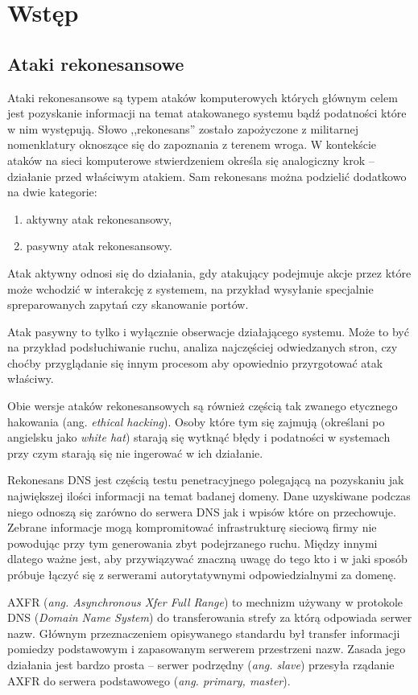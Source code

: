 \chapter{Wstęp}

\section{Ataki rekonesansowe}
Ataki rekonesansowe są typem ataków komputerowych których głównym celem jest pozyskanie informacji na temat atakowanego systemu bądź podatności które w nim występują. Słowo ,,rekonesans'' zostało zapożyczone z militarnej nomenklatury oknoszące się do zapoznania z terenem wroga. W kontekście ataków na sieci komputerowe stwierdzeniem określa się analogiczny krok -- działanie przed właściwym atakiem. Sam rekonesans można podzielić dodatkowo na dwie kategorie:
\begin{enumerate}
	\item aktywny atak rekonesansowy,
	\item pasywny atak rekonesansowy.
\end{enumerate}
Atak aktywny odnosi się do działania, gdy atakujący podejmuje akcje przez które może wchodzić w interakcję z systemem, na przykład wysyłanie specjalnie spreparowanych zapytań czy skanowanie portów.

Atak pasywny to tylko i wyłącznie obserwacje działającego systemu. Może to być na przykład podsłuchiwanie ruchu, analiza najczęściej odwiedzanych stron, czy choćby przyglądanie się innym procesom aby opowiednio przyrgotować atak właściwy.

Obie wersje ataków rekonesansowych są również częścią tak zwanego etycznego hakowania (ang. \textit{ethical hacking}). Osoby które tym się zajmują (określani po angielsku jako \textit{white hat}) starają się wytknąć błędy i podatności w systemach przy czym starają się nie ingerować w ich działanie.

Rekonesans DNS jest częścią testu penetracyjnego polegającą na pozyskaniu jak największej ilości informacji na temat badanej domeny. Dane uzyskiwane podczas niego odnoszą się zarówno do serwera DNS jak i wpisów które on przechowuje. Zebrane informacje mogą kompromitować infrastrukturę sieciową firmy nie powodując przy tym generowania zbyt podejrzanego ruchu. Między innymi dlatego ważne jest, aby przywiązywać znaczną uwagę do tego kto i w jaki sposób próbuje łączyć się z serwerami autorytatywnymi odpowiedzialnymi za domenę.


AXFR (\textit{ang. Asynchronous Xfer Full Range}) to mechnizm używany w protokole DNS (\textit{Domain Name System}) do transferowania strefy za którą odpowiada serwer nazw. Głównym przeznaczeniem opisywanego standardu był transfer informacji pomiedzy podstawowym i zapasowanym serwerem przestrzeni nazw. Zasada jego działania jest bardzo prosta -- serwer podrzędny (\textit{ang. slave}) przesyła rządanie AXFR do serwera podstawowego (\textit{ang. primary, master}).

